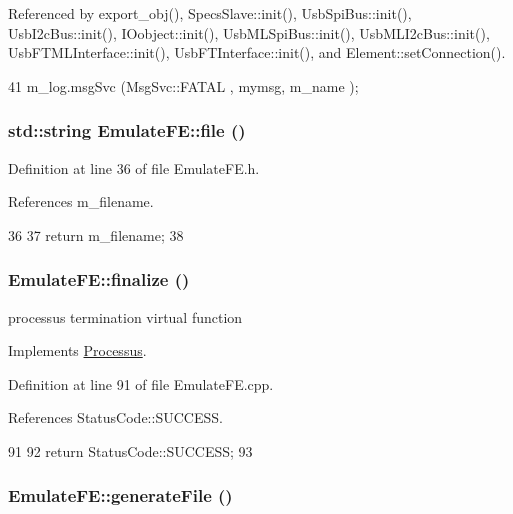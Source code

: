 Referenced by export\_\-obj(), SpecsSlave::init(), UsbSpiBus::init(), UsbI2cBus::init(), IOobject::init(), UsbMLSpiBus::init(), UsbMLI2cBus::init(), UsbFTMLInterface::init(), UsbFTInterface::init(), and Element::setConnection().


\begin{DoxyCode}
41 { m_log.msgSvc (MsgSvc::FATAL   , mymsg, m_name ); }
\end{DoxyCode}
\hypertarget{classEmulateFE_a321a82d6ead6f6089693d3165d7893ec}{
\subsubsection[{file}]{\setlength{\rightskip}{0pt plus 5cm}std::string EmulateFE::file ()}}
\label{classEmulateFE_a321a82d6ead6f6089693d3165d7893ec}


Definition at line 36 of file EmulateFE.h.

References m\_\-filename.


\begin{DoxyCode}
36                   {
37     return m_filename;
38   }
\end{DoxyCode}
\hypertarget{classEmulateFE_a7d29ee79a606d0f7d337b1e78ef54a03}{
\subsubsection[{finalize}]{ EmulateFE::finalize ()}}
\label{classEmulateFE_a7d29ee79a606d0f7d337b1e78ef54a03}
processus termination virtual function 

Implements \hyperlink{classProcessus_aba93d691f031bdb18ae4b8afb1b2e856}{Processus}.

Definition at line 91 of file EmulateFE.cpp.

References StatusCode::SUCCESS.


\begin{DoxyCode}
91                                  {
92   return StatusCode::SUCCESS;
93 }
\end{DoxyCode}
\hypertarget{classEmulateFE_ae62bc56b44c4bcdf7f5eab5cbde2cd69}{
\subsubsection[{generateFile}]{ EmulateFE::generateFile ()}}
\label{classEmulateFE_ae62bc56b44c4bcdf7f5eab5cbde2cd69}


